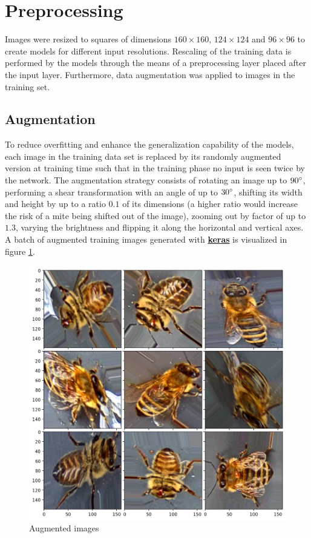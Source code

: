 \documentclass[12pt,a4paper]{article}
\begin{document}
\section{Preprocessing}

Images were resized to squares of dimensions $160 \times 160$, $124 \times 124$ and $96 \times 96$ to create models for different input resolutions. Rescaling of the training data is performed by the models through the means of a preprocessing layer placed after the input layer. Furthermore, data augmentation was applied to images in the training set.

\subsection{Augmentation}

To reduce overfitting and enhance the generalization capability of the models, each image in the training data set is replaced by its randomly augmented version at training time such that in the training phase no input is seen twice by the network. The augmentation strategy consists of rotating an image up to $90 \degree$, performing a shear transformation with an angle of up to $30 \degree$, shifting its width and height by up to a ratio $0.1$ of its dimensions (a higher ratio would increase the risk of a mite being shifted out of the image), zooming out by factor of up to $1.3$, varying the brightness and flipping it along the horizontal and vertical axes. A batch of augmented training images generated with \href{https://github.com/fchollet/keras}{\textbf{keras}} is visualized in figure \ref{figure:data_augmentation}.

\begin{figure}[H]
\centering
\includegraphics[width=13.5cm]{data_augmentation.png}
\caption{Augmented images}
\label{figure:data_augmentation}
\end{figure}
\end{document}

